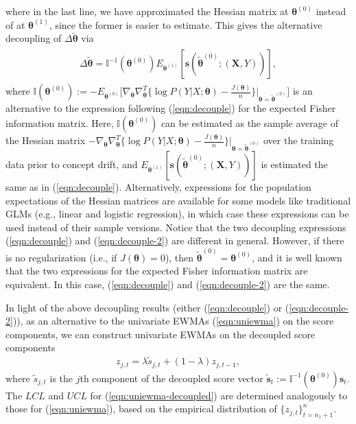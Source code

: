 \documentclass[twoside,11pt]{article}
\begin{document}
where in the last line, we have approximated the Hessian matrix at $\bm{\theta}^{(0)}$ instead of at $\bm{\theta}^{(1)}$, since the former is easier to estimate. This gives the alternative decoupling of $\Delta \tilde{\bm { \theta}}$ via 
\begin{align}
\begin{aligned}
 \Delta \tilde{\bm { \theta}} = \mathbb {I}^{-1}(\bm { \theta}^{ (0)}) E_{\bm{ \theta}^{ (1)}}[\bm{s}(\tilde{ \bm { \theta}} ^{ (0)}; (\bm {X}, Y))], 
\end{aligned}
\label{eqn:decouple-2}
\end{align}
where $\mathbb {I}(\bm { \theta}^{ (0)}) := - E_{\bm { \theta}^{ (0)}} \big[ \nabla_{\bm{\theta}} \nabla^T_{\bm{\theta}} \big\{ \log{P(Y | X; \bm{\theta})} - \frac{J(\bm{\theta})}{n} \big\} |_{\bm{\theta} = \tilde{\bm{\theta}}^{(0)}} \big]$ is an alternative to the expression following (\ref{eqn:decouple}) for the expected Fisher information matrix. Here, $\mathbb {I}(\bm { \theta}^{ (0)})$ can be estimated as the sample average of the Hessian matrix $-\nabla_{\bm{\theta}} \nabla^T_{\bm{\theta}} \big\{ \log{P(Y | X; \bm{\theta})} - \frac{J(\bm{\theta})}{n} \big\} |_{\bm{\theta} = \tilde{\bm{\theta}}^{(0)}}$ over the training data prior to concept drift, and $E_{\bm{ \theta}^{ (1)}} [\bm{s}(\tilde{ \bm { \theta}} ^{ (0)}; (\bm {X}, Y))]$ is estimated the same as in (\ref{eqn:decouple}). Alternatively, expressions for the population expectations of the Hessian matrices are available for some models like traditional GLMs (e.g., linear and logistic regression), in which case these expressions can be used instead of their sample versions. Notice that the two decoupling expressions (\ref{eqn:decouple}) and (\ref{eqn:decouple-2}) are different in general. However, if there is no regularization (i.e., if $J(\bm{\theta}) = 0$), then $\tilde{ \bm { \theta}} ^{ (0)} = \bm { \theta} ^{ (0)}$, and it is well known that the two expressions for the expected Fisher information matrix are equivalent. In this case, (\ref{eqn:decouple}) and (\ref{eqn:decouple-2}) are the same.
 
In light of the above decoupling results (either (\ref{eqn:decouple}) or (\ref{eqn:decouple-2})), as an alternative to the univariate EWMAs (\ref{eqn:uniewma}) on the score components, we can construct univariate EWMAs on the decoupled score components
\begin{align}
z_{j,t} = \lambda \tilde{s}_{j,t} + (1 - \lambda) z_{j,t-1},
\label{eqn:uniewma-decoupled}
\end{align}
where $\tilde{s}_{j,t}$ is the $j$th component of the decoupled score vector $\tilde{\bm{s}}_t := \mathbb {I}^{-1}(\bm { \theta}^{ (0)})\bm{s}_t$. The $LCL$ and $UCL$  for (\ref{eqn:uniewma-decoupled}) are determined analogously to those for (\ref{eqn:uniewma}), based on the empirical distribution of $\{z_{j,t}\}_{t=n_1+1}^n$.  
\end{document}
